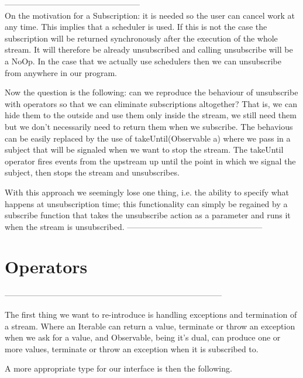--------------------------------------------------\\
On the motivation for a Subscription: it is needed so the user can cancel work at any time. This implies that a scheduler is used. If this is not the case the subscription will be returned synchronously after the execution of the whole stream. It will therefore be already unsubscribed and calling unsubscribe will be a NoOp. In the case that we actually use schedulers then we can unsubscribe from anywhere in our program. 

Now the question is the following: can we reproduce the behaviour of unsubscribe with operators so that we can eliminate subscriptions altogether? That is, we can hide them to the outside and use them only inside the stream, we still need them but we don't necessarily need to return them when we subscribe. The behavious can be easily replaced by the use of takeUntil(Observable a) where we pass in a subject that will be signaled when we want to stop the stream. The takeUntil operator fires events from the upstream up until the point in which we signal the subject, then stops the stream and unsubscribes. 

With this approach we seemingly lose one thing, i.e. the ability to specify what happens at unsubscription time; this functionality can simply be regained by a subscribe function that takes the unsubscribe action as a parameter and runs it when the stream is unsubscribed.
--------------------------------------------------

\section{Operators}
\label{operators}

--------------------------------------------------------------------------------

The first thing we want to re-introduce is handling exceptions and termination of a stream. Where an Iterable can return a value, terminate or throw an exception when we ask for a value, and Observable, being it's dual, can produce one or more values, terminate or throw an exception when it is subscribed to. 

A more appropriate type for our interface is then the following.\\

\\


